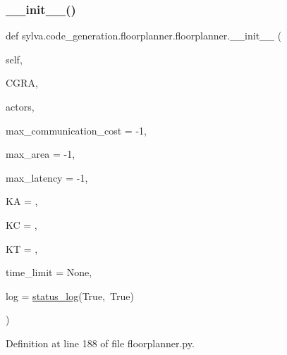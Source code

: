\subsubsection{\texorpdfstring{\+\_\+\+\_\+init\+\_\+\+\_\+()}{\_\_init\_\_()}}
{\footnotesize\ttfamily def sylva.\+code\+\_\+generation.\+floorplanner.\+floorplanner.\+\_\+\+\_\+init\+\_\+\+\_\+ (\begin{DoxyParamCaption}\item[{}]{self,  }\item[{}]{C\+G\+RA,  }\item[{}]{actors,  }\item[{}]{max\+\_\+communication\+\_\+cost = {\ttfamily -\/1},  }\item[{}]{max\+\_\+area = {\ttfamily -\/1},  }\item[{}]{max\+\_\+latency = {\ttfamily -\/1},  }\item[{}]{KA = {},  }\item[{}]{KC = {},  }\item[{}]{KT = {},  }\item[{}]{time\+\_\+limit = {\ttfamily None},  }\item[{}]{log = {\ttfamily \hyperlink{classsylva_1_1misc_1_1util_1_1status__log}{status\+\_\+log}(True,~True)} }\end{DoxyParamCaption})}



Definition at line 188 of file floorplanner.\+py.


